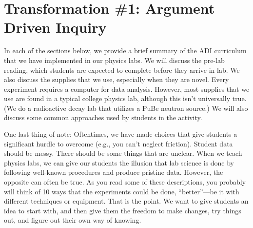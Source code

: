 \documentclass[aip, numerical, preprint]{revtex4-2}
\begin{document}
\section{Transformation \#1: Argument Driven Inquiry}
In each of the sections below, we provide a brief summary of the ADI curriculum that we have
implemented in our physics labs.  We will discuss the pre-lab reading, which students are
expected to complete before they arrive in lab.  We also discuss the supplies that we use,
especially when they are novel.  Every experiment requires a computer for data analysis.
However, most supplies that we use are found in a typical college physics lab, although this
isn't universally true.  (We do a radioactive decay lab that utilizes a PuBe neutron source.)
We will also discuss some common approaches used by students in the activity.

One last thing of note: Oftentimes, we have made choices that give students a significant
hurdle to overcome (e.g., you can't neglect friction).  Student data should be messy.  There
should be some things that are unclear.  When we teach physics labs, we can give our students
the illusion that lab science is done by following well-known procedures and produce pristine
data. However, the opposite can often be true. As you read some of these descriptions, you
probably will think of 10 ways that the experiments could be done, ``better''---be it with
different techniques or equipment.  That is the point.  We want to give students an idea to
start with, and then give them the freedom to make changes, try things out, and figure out
their own way of knowing.  
\end{document}
